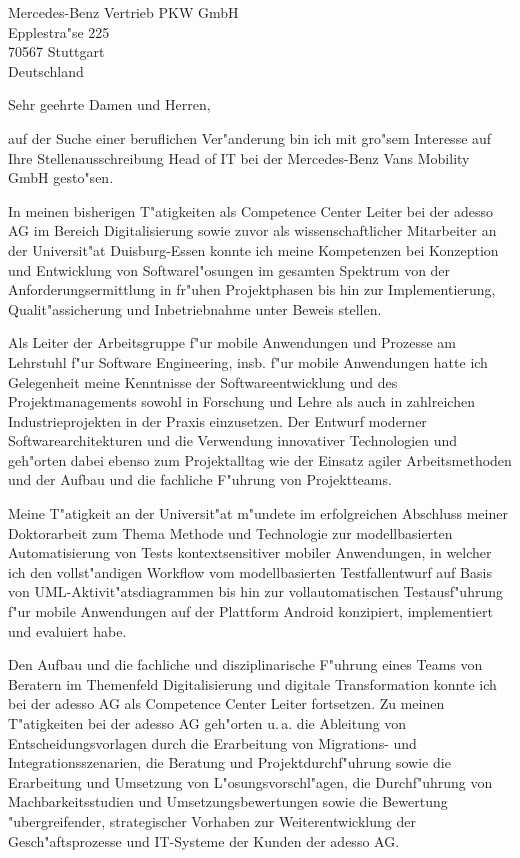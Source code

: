 \documentclass[11pt,a4paper]{dinbrief}
\date{\today}
\begin{document}
 
\begin{letter}  
{%
	Mercedes-Benz Vertrieb PKW GmbH\\
	Epplestra"se 225\\
	70567 Stuttgart\\
	Deutschland 
}
\subject{\bf Bewerbung Head of IT bei der Mercedes-Benz Vans Mobility GmbH}
\opening{Sehr geehrte Damen und Herren,}
auf der Suche einer beruflichen Ver"anderung bin ich mit gro"sem Interesse auf Ihre Stellenausschreibung Head of IT bei der Mercedes-Benz Vans Mobility GmbH gesto"sen. 

In meinen bisherigen T"atigkeiten als Competence Center Leiter bei der adesso AG im Bereich Digitalisierung sowie zuvor als wissenschaftlicher Mitarbeiter an der Universit"at Duisburg-Essen konnte ich meine Kompetenzen bei Konzeption und Entwicklung von Softwarel"osungen im gesamten Spektrum von der Anforderungsermittlung in fr"uhen Projektphasen bis hin zur Implementierung, Qualit"assicherung und Inbetriebnahme unter Beweis stellen.

Als Leiter der Arbeitsgruppe f"ur mobile Anwendungen und Prozesse am Lehrstuhl f"ur Software Engineering, insb. f"ur mobile Anwendungen hatte ich Gelegenheit meine Kenntnisse der Softwareentwicklung und des Projektmanagements sowohl in Forschung und Lehre als auch in zahlreichen Industrieprojekten in der Praxis einzusetzen. Der Entwurf moderner Softwarearchitekturen und die Verwendung innovativer Technologien und geh"orten dabei ebenso zum Projektalltag wie der Einsatz agiler Arbeitsmethoden und der Aufbau und die fachliche  F"uhrung von Projektteams.

Meine T"atigkeit an der Universit"at m"undete im erfolgreichen Abschluss meiner Doktor\-arbeit zum Thema Methode und Technologie zur modellbasierten Automatisierung von Tests kontextsensitiver mobiler Anwendungen, in welcher ich den vollst"andigen Workflow vom modellbasierten Testfallentwurf auf Basis von UML-Aktivit"atsdiagrammen bis hin zur vollautomatischen Testausf"uhrung f"ur mobile Anwendungen auf der Plattform Android konzipiert, implementiert und evaluiert habe.

\clearpage
Den Aufbau und die fachliche und disziplinarische F"uhrung eines Teams von Beratern im Themenfeld Digitalisierung und digitale Transformation  konnte ich bei der adesso AG als Competence Center Leiter fortsetzen. Zu meinen T"atigkeiten bei der adesso AG geh"orten u.\,a. die Ableitung von Entscheidungsvorlagen durch die Erarbeitung von Migrations- und Integrationsszenarien, die Beratung und Projektdurchf"uhrung sowie die Erarbeitung und Umsetzung von L"osungsvorschl"agen, die Durchf"uhrung von Machbarkeitsstudien und Umsetzungsbewertungen sowie die Bewertung "ubergreifender, strategischer Vorhaben zur Weiterentwicklung der Gesch"aftsprozesse und IT-Systeme der Kunden der adesso AG.


\end{letter}
\end{document}
